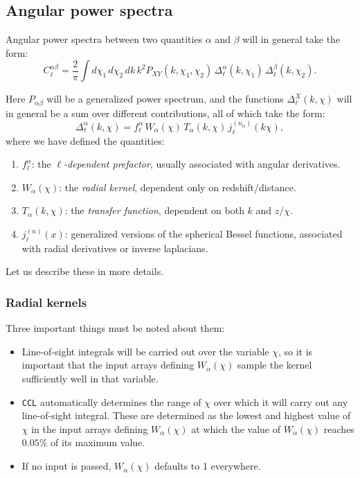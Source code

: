 \documentclass[\docopts]{\docclass}
\begin{document}
\subsection{Angular power spectra}
\label{sec:cl}

Angular power spectra between two quantities $\alpha$ and $\beta$ will in general take the form:
\begin{equation}
  C^{\alpha\beta}_\ell=\frac{2}{\pi}\int d\chi_1\,d\chi_2\,dk\,k^2 P_{XY}(k,\chi_1,\chi_2)\,\Delta^\alpha_\ell(k,\chi_1)\,\Delta^\beta_\ell(k,\chi_2).
\end{equation}

Here $P_{\alpha\beta}$ will be a generalized power spectrum, and the functions $\Delta^X_\ell(k,\chi)$ will in general be a sum over
different contributions, all of which take the form:
\begin{equation}
  \Delta^\alpha_\ell(k,\chi)=f^\alpha_\ell\,W_\alpha(\chi)\,T_\alpha(k,\chi)\,j^{(n_\alpha)}_\ell(k\chi),
\end{equation}
where we have defined the quantities:
\begin{enumerate}
 \item $f^\alpha_\ell$: the \emph{$\ell$-dependent prefactor}, usually associated with angular derivatives.
 \item $W_\alpha(\chi)$: the \emph{radial kernel}, dependent only on redshift/distance.
 \item $T_\alpha(k,\chi)$: the \emph{transfer function}, dependent on both $k$ and $z/\chi$.
 \item $j^{(n)}_\ell(x)$: generalized versions of the spherical Bessel functions, associated with radial derivatives or inverse laplacians.
\end{enumerate}
Let us describe these in more details.

\subsubsection*{Radial kernels}
Three important things must be noted about them:
\begin{itemize}
 \item Line-of-sight integrals will be carried out over the variable $\chi$, so it is important that the input arrays defining $W_\alpha(\chi)$ sample the kernel sufficiently well in that variable.
 \item {\tt CCL} automatically determines the range of $\chi$ over which it will carry out any line-of-sight integral. These are determined as the lowest and highest value of $\chi$ in the input arrays defining $W_\alpha(\chi)$ at which the value of $W_\alpha(\chi)$ reaches $0.05\%$ of its maximum value.
 \item If no input is passed, $W_\alpha(\chi)$ defaults to 1 everywhere.
\end{itemize}
\end{document}
